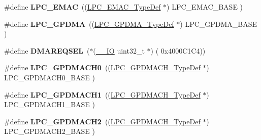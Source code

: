 \begin{DoxyCompactItemize}
\item 
\hypertarget{group___l_p_c17xx___system_ga75e74c74e4b52e53d56b9e13be2bc5b5}{\#define {\bfseries \-L\-P\-C\-\_\-\-E\-M\-A\-C}~((\hyperlink{struct_l_p_c___e_m_a_c___type_def}{\-L\-P\-C\-\_\-\-E\-M\-A\-C\-\_\-\-Type\-Def}      $\ast$) \-L\-P\-C\-\_\-\-E\-M\-A\-C\-\_\-\-B\-A\-S\-E     )}\label{group___l_p_c17xx___system_ga75e74c74e4b52e53d56b9e13be2bc5b5}

\item 
\hypertarget{group___l_p_c17xx___system_gaf9d4b843ddff8d08a27880f90e2dbf18}{\#define {\bfseries \-L\-P\-C\-\_\-\-G\-P\-D\-M\-A}~((\hyperlink{struct_l_p_c___g_p_d_m_a___type_def}{\-L\-P\-C\-\_\-\-G\-P\-D\-M\-A\-\_\-\-Type\-Def}     $\ast$) \-L\-P\-C\-\_\-\-G\-P\-D\-M\-A\-\_\-\-B\-A\-S\-E    )}\label{group___l_p_c17xx___system_gaf9d4b843ddff8d08a27880f90e2dbf18}

\item 
\hypertarget{group___l_p_c17xx___system_ga026df42ac9515b2f8271e562a4d4f3ba}{\#define {\bfseries \-D\-M\-A\-R\-E\-Q\-S\-E\-L}~($\ast$(\hyperlink{group___c_m_s_i_s__core__definitions_gaec43007d9998a0a0e01faede4133d6be}{\-\_\-\-\_\-\-I\-O} uint32\-\_\-t $\ast$)  ( 0x4000\-C1\-C4))}\label{group___l_p_c17xx___system_ga026df42ac9515b2f8271e562a4d4f3ba}

\item 
\hypertarget{group___l_p_c17xx___system_ga1faf7af762ef1c89d7c9cca935fbfdb6}{\#define {\bfseries \-L\-P\-C\-\_\-\-G\-P\-D\-M\-A\-C\-H0}~((\hyperlink{struct_l_p_c___g_p_d_m_a_c_h___type_def}{\-L\-P\-C\-\_\-\-G\-P\-D\-M\-A\-C\-H\-\_\-\-Type\-Def}   $\ast$) \-L\-P\-C\-\_\-\-G\-P\-D\-M\-A\-C\-H0\-\_\-\-B\-A\-S\-E )}\label{group___l_p_c17xx___system_ga1faf7af762ef1c89d7c9cca935fbfdb6}

\item 
\hypertarget{group___l_p_c17xx___system_ga663e789f3e8396669882e7d338116a87}{\#define {\bfseries \-L\-P\-C\-\_\-\-G\-P\-D\-M\-A\-C\-H1}~((\hyperlink{struct_l_p_c___g_p_d_m_a_c_h___type_def}{\-L\-P\-C\-\_\-\-G\-P\-D\-M\-A\-C\-H\-\_\-\-Type\-Def}   $\ast$) \-L\-P\-C\-\_\-\-G\-P\-D\-M\-A\-C\-H1\-\_\-\-B\-A\-S\-E )}\label{group___l_p_c17xx___system_ga663e789f3e8396669882e7d338116a87}

\item 
\hypertarget{group___l_p_c17xx___system_ga10facbb9af335faa6898e205715fe91a}{\#define {\bfseries \-L\-P\-C\-\_\-\-G\-P\-D\-M\-A\-C\-H2}~((\hyperlink{struct_l_p_c___g_p_d_m_a_c_h___type_def}{\-L\-P\-C\-\_\-\-G\-P\-D\-M\-A\-C\-H\-\_\-\-Type\-Def}   $\ast$) \-L\-P\-C\-\_\-\-G\-P\-D\-M\-A\-C\-H2\-\_\-\-B\-A\-S\-E )}\label{group___l_p_c17xx___system_ga10facbb9af335faa6898e205715fe91a}


\end{DoxyCompactItemize}
